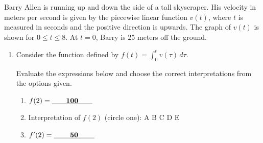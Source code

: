 \documentclass{article}
\begin{document}
\begin{enumerate}
{\begin{framed}
    Barry Allen is running up and down the side of a tall skyscraper. His velocity in meters per second is given by the piecewise linear function $v(t)$, where $t$ is measured in seconds and the positive direction is upwards. The graph of $v(t)$ is shown for $0\leq t \leq 8$. At $t=0$, Barry is 25 meters off the ground.
    \vspace{-12pt}
    \begin{center}
    \end{center}
    \end{framed}
    }

\begin{enumerate}[resume]

        \item 
        \begin{problem}
            Consider the function defined by $\displaystyle f(t) = \int_0^t v(\tau)\,d\tau$. 
            
            Evaluate the expressions below and choose the correct interpretations from the options given.
        \end{problem}

\pspace{6pt}
    \begin{enumerate}
    \item 
    \begin{problem}
        $f(2)=\cfitb{2cm}{100}$
    \end{problem}
    \pspace{12pt}

    \item
    \begin{problem}
    Interpretation of $f(2)$ (circle one): \hfill A \hfill B \hfill C \hfill D \hfill E
    \end{problem}
    \pspace{12pt}

    \item 
    \begin{problem}
        $f'(2)=\cfitb{2cm}{50}$
    \end{problem}
    \pspace{12pt}


\end{enumerate}
\end{enumerate}
\end{enumerate}
\end{document}

